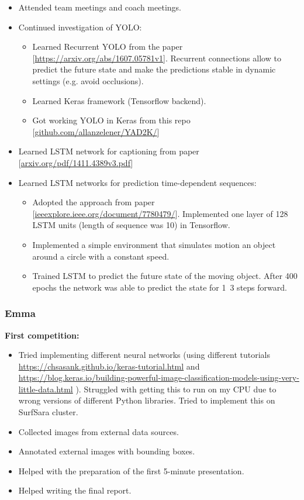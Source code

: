 \documentclass[a4paper]{article}
\begin{document}
\begin{itemize}
	\item Attended team meetings and coach meetings.
	\item Continued investigation of YOLO:
	\begin{itemize}
		\item Learned Recurrent YOLO from the paper [\url{https://arxiv.org/abs/1607.05781v1}]. Recurrent connections allow to predict the future state and make the predictions stable in dynamic settings (e.g. avoid occlusions).
		\item Learned Keras framework (Tensorflow backend).
		\item Got working YOLO in Keras from this repo [\url{github.com/allanzelener/YAD2K/}]
	\end{itemize}
	\item Learned LSTM network for captioning from paper [\url{arxiv.org/pdf/1411.4389v3.pdf}]
	\item Learned LSTM networks for prediction time-dependent sequences:
	\begin{itemize}
		\item Adopted the approach from paper [\url{ieeexplore.ieee.org/document/7780479/}]. Implemented one layer of 128 LSTM units (length of sequence was 10) in Tensorflow.
		\item Implemented a simple environment that simulates motion an object around a circle with a constant speed.
		\item Trained LSTM to predict the future state of the moving object. After 400 epochs the network was able to predict the state for 1~3 steps forward. 
	\end{itemize}
\end{itemize}


\subsubsection*{Emma}

\textbf{First competition:}

\begin{itemize}
	\item Tried implementing different neural networks (using different tutorials \url{https://chsasank.github.io/keras-tutorial.html} and \url{https://blog.keras.io/building-powerful-image-classification-models-using-very-little-data.html}
). Struggled with getting this to run on my CPU due to wrong versions of different Python libraries. Tried to implement this on SurfSara cluster.
	\item Collected images from external data sources.
	\item Annotated external images with bounding boxes.
	\item Helped with the preparation of the first 5-minute presentation.
	\item Helped writing the final report.
\end{itemize}
\end{document}
